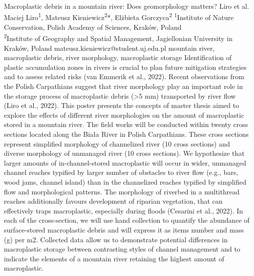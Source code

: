 \abstract
{Macroplastic debris in a mountain river: Does geomorphology matters?} 
{Liro et al.} 
{Maciej Liro\textsuperscript{1}, Mateusz Kieniewicz\textsuperscript{2}*, Elżbieta Gorczyca\textsuperscript{2}} 
{\POtag} 
{
\textsuperscript{1}Institute of Nature Conservation, Polish Academy of Sciences, Kraków, Poland\\
\textsuperscript{2}Institute of Geography and Spatial Management, Jagiellonian University in Kraków, Poland
}
{mateusz.kieniewicz@student.uj.edu.pl}  %
{mountain river, macroplastic debris, river morphology, macroplastic storage }
{Identification of plastic accumulation zones in rivers is crucial to plan future mitigation strategies and to assess related risks (van Emmerik et al., 2022). Recent observations from the Polish Carpathians suggest that river morphology play an important role in the storage process of macroplastic debris (>5 mm) transported by river flow (Liro et al., 2022). This poster presents the concepts of master thesis aimed to explore the effects of different river morphologies on the amount of macroplastic stored in a mountain river. The field works will be conducted within twenty cross sections located along the Biała River in Polish Carpathians. These cross sections represent simplified morphology of channelized river (10 cross sections) and diverse morphology of unmanaged river (10 cross sections). We hypothesize that larger amounts of in-channel-stored macroplastic will occur in wider, unmanaged channel reaches typified by larger number of obstacles to river flow (e.g., bars, wood jams, channel island) than in the channelized reaches typified by simplified flow and morphological patterns. The morphology of riverbed in a multithread reaches additionally favours development of riparian vegetation, that can effectively traps macroplastic, especially during floods (Cesarini et al., 2022). In each of the cross-section, we will use hand collection to quantify the abundance of surface-stored macroplastic debris and will express it as items number and mass (g) per m2. Collected data allow us to demonstrate potential differences in macroplastic storage between contrasting styles of channel management and to indicate the elements of a mountain river retaining the highest amount of macroplastic.
}
